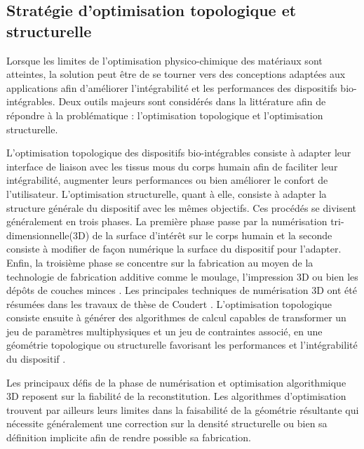 	\subsection{Stratégie d'optimisation topologique et structurelle}
	\label{subsec:1.2.2_Strategie numerique}
Lorsque les limites de l'optimisation physico-chimique des matériaux sont atteintes, la solution peut être de se tourner vers des conceptions adaptées aux applications afin d'améliorer l'intégrabilité et les performances des dispositifs bio-intégrables. Deux outils majeurs sont considérés dans la littérature afin de répondre à la problématique : l'optimisation topologique et l'optimisation structurelle.

L'optimisation topologique des dispositifs bio-intégrables consiste à adapter leur interface de liaison avec les tissus mous du corps humain afin de faciliter leur intégrabilité, augmenter leurs performances ou bien améliorer le confort de l'utilisateur. L'optimisation structurelle, quant à elle, consiste à adapter la structure générale du dispositif avec les mêmes objectifs. Ces procédés se divisent généralement en trois phases. La première phase passe par la numérisation tri-dimensionnelle(3D) de la surface d'intérêt sur le corps humain et la seconde consiste à modifier de façon numérique la surface du dispositif pour l'adapter. Enfin, la troisième phase se concentre sur la fabrication au moyen de la technologie de fabrication additive comme le moulage, l'impression 3D ou bien les dépôts de couches minces \cite{Mennad2015}. Les principales techniques de numérisation 3D ont été résumées dans les travaux de thèse de Coudert \cite{Coudert2005}. L'optimisation topologique consiste ensuite à générer des algorithmes de calcul capables de transformer un jeu de paramètres multiphysiques et un jeu de contraintes associé, en une géométrie topologique ou structurelle favorisant les performances et l'intégrabilité du dispositif \cite{Liu2018}.

Les principaux défis de la phase de numérisation et optimisation algorithmique 3D reposent sur la fiabilité de la reconstitution. Les algorithmes d'optimisation trouvent par ailleurs leurs limites dans la faisabilité de la géométrie résultante qui nécessite généralement une correction sur la densité structurelle \cite{Zegard2016} ou bien sa définition implicite \cite{Vogiatzis2017} afin de rendre possible sa fabrication. 
